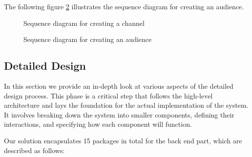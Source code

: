 \noindent The following figure \ref{seq-create-audience} illustrates the sequence diagram for creating an audience.

\begin{landscape}
    \begin{figure}[hbt!]
        \centering
        
        \caption{Sequence diagram for creating a channel}
        \label{seq-create-channel}
    \end{figure}
\end{landscape}

\begin{landscape}
    \begin{figure}[hbt!]
        \centering
        
        \caption{Sequence diagram for creating an audience}
        \label{seq-create-audience}
    \end{figure}
\end{landscape}

\subsection{Detailed Design}
In this section we provide an in-depth look at various aspects of the detailed design process.
This phase is a critical step that follows the high-level architecture and lays the foundation
for the actual implementation of the system. It involves breaking down the system into smaller
components, defining their interactions, and specifying how each component will function.

\noindent Our solution encapsulates 15 packages in total for the back end part, which are described as follows:


